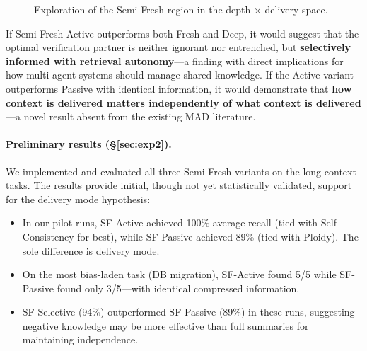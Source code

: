 \documentclass[11pt]{article}
\begin{document}
\begin{figure}[t]
\centering
{}
\caption{Exploration of the Semi-Fresh region in the depth $\times$ delivery space.}
\label{fig:semifresh}
\end{figure}

If Semi-Fresh-Active outperforms both Fresh and Deep, it would suggest that the optimal verification partner is neither ignorant nor entrenched, but \textbf{selectively informed with retrieval autonomy}---a finding with direct implications for how multi-agent systems should manage shared knowledge. If the Active variant outperforms Passive with identical information, it would demonstrate that \textbf{how context is delivered matters independently of what context is delivered}---a novel result absent from the existing MAD literature.

\paragraph{Preliminary results (\S\ref{sec:exp2}).} We implemented and evaluated all three Semi-Fresh variants on the long-context tasks. The results provide initial, though not yet statistically validated, support for the delivery mode hypothesis:

\begin{itemize}[leftmargin=1.5em]
  \item In our pilot runs, SF-Active achieved 100\% average recall (tied with Self-Consistency for best), while SF-Passive achieved 89\% (tied with Ploidy). The sole difference is delivery mode.
  \item On the most bias-laden task (DB migration), SF-Active found 5/5 while SF-Passive found only 3/5---with identical compressed information.
  \item SF-Selective (94\%) outperformed SF-Passive (89\%) in these runs, suggesting negative knowledge may be more effective than full summaries for maintaining independence.
\end{itemize}
\end{document}
